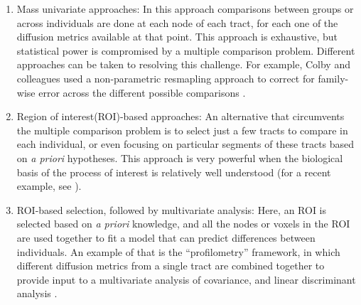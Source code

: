 \begin{enumerate}

\item Mass univariate approaches: In this approach comparisons between groups or
across individuals are done at each node of each tract, for each one of the
diffusion metrics available at that point. This approach is exhaustive, but
statistical power is compromised by a multiple comparison problem. Different
approaches can be taken to resolving this challenge. For example, Colby and
colleagues \cite{colby2012} used a non-parametric resmapling approach to correct
for family-wise error across the different possible comparisons
\cite{Nichols2002-zu, Nichols2003-yy}.

\item Region of interest(ROI)-based approaches: An alternative that circumvents
the multiple comparison problem is to select just a few tracts to compare in
each individual, or even focusing on particular segments of these tracts based
on \emph{a priori} hypotheses. This approach is very powerful when the
biological basis of the process of interest is relatively well understood (for a
recent example, see \cite{huber2018rapid}).

\item ROI-based selection, followed by multivariate analysis: Here, an ROI is
selected based on \emph{a priori} knowledge, and all the nodes or voxels in the
ROI are used together to fit a model that can predict differences between
individuals. An example of that is the ``profilometry'' framework, in which
different diffusion metrics from a single tract are combined together to provide
input to a multivariate analysis of covariance, and linear discriminant analysis
\cite{dayan2016profilometry}.

\end{enumerate}

